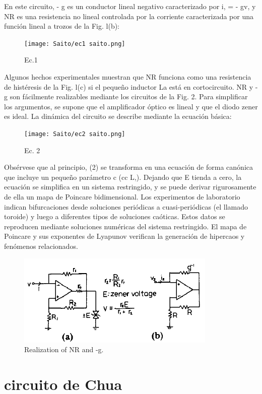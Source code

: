 \documentclass{article}
\begin{document}
    En este circuito, - g es un conductor lineal negativo caracterizado por i, = - gv, y NR es una resistencia no lineal controlada por la corriente caracterizada por una función lineal a trozos de la Fig. l(b):
    \begin{figure}[h]
        \centering
        \texttt{[image: Saito/ec1 saito.png]}
        \caption{Ec.1}
        \label{fig ec1:saito}
    \end{figure}
    Algunos hechos experimentales muestran que NR funciona como una resistencia de histéresis de la Fig. l(c) si el pequeño inductor La está en cortocircuito. NR y - g son fácilmente realizables mediante los circuitos de la Fig. 2. Para simplificar los argumentos, se supone que el amplificador óptico es lineal y que el diodo zener es ideal. La dinámica del circuito se describe mediante la ecuación básica: 
    \begin{figure}[h]
        \centering
        \texttt{[image: Saito/ec2 saito.png]}
        \caption{Ec. 2}
        \label{fig ec2:saito}
    \end{figure}
    Obsérvese que al principio, (2) se transforma en una ecuación de forma canónica que incluye un pequeño parámetro c (cc L,). Dejando que E tienda a cero, la ecuación se simplifica en un sistema restringido, y se puede derivar rigurosamente de ella un mapa de Poincare bidimensional. Los experimentos de laboratorio indican bifurcaciones desde soluciones periódicas a cuasi-periódicas (el llamado toroide) y luego a diferentes tipos de soluciones caóticas. Estos datos se reproducen mediante soluciones numéricas del sistema restringido. El mapa de Poincare y sus exponentes de Lyapunov verifican la generación de hipercaos y fenómenos relacionados. 
    \begin{figure}[h]
        \centering
        \includegraphics{Saito/fig. 2 saito.png}
        \caption{Realization of NR and -g.}
        \label{fig2:saito}
    \end{figure}

\section{circuito de Chua}
\end{document}
